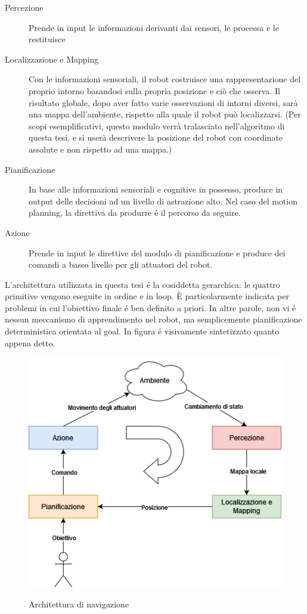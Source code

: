 \documentclass[14pt,a4paper]{extarticle}
\begin{document}
\begin{description}
\item[Percezione] Prende in input le informazioni derivanti dai sensori, le processa e le restituisce
\item[Localizzazione e Mapping] Con le informazioni sensoriali, il robot costruisce una rappresentazione del proprio intorno basandosi sulla propria posizione e ciò che osserva. Il risultato globale, dopo aver fatto varie osservazioni di intorni diversi, sarà una mappa dell'ambiente, rispetto alla quale il robot può localizzarsi. (Per scopi esemplificativi, questo modulo verrà tralasciato nell'algoritmo di questa tesi, e si userà descrivere la posizione del robot con coordinate assolute e non rispetto ad una mappa.)
\item[Pianificazione] In base alle informazioni sensoriali e cognitive in possesso, produce in output delle decisioni ad un livello di astrazione alto. Nel caso del motion planning, la direttiva da produrre é il percorso da seguire.
\item[Azione] Prende in input le direttive del modulo di pianificazione e produce dei comandi a basso livello per gli attuatori del robot.
\end{description}
L'architettura utilizzata in questa tesi é la cosiddetta gerarchica: le quattro primitive vengono eseguite in ordine e in loop. È particolarmente indicata per problemi in cui l'obiettivo finale é ben definito a priori. In altre parole, non vi é nessun meccanismo di apprendimento nel robot, ma semplicemente pianificazione deterministica orientata al goal. In figura é visivamente sintetizzato quanto appena detto.

\begin{figure}[H]
\caption{Architettura di navigazione}
\centering
\includegraphics[width=\textwidth]{architecture.png}
\label{arch}
\end{figure}
\end{document}

